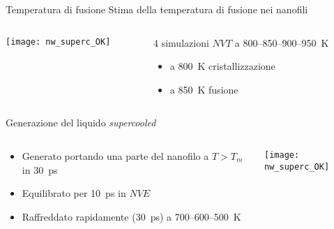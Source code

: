 \documentclass{beamer}
\begin{document}
\begin{frame}{Temperatura di fusione}
\centering
Stima della temperatura di fusione nei nanofili\\[12pt]
\begin{columns}
\begin{column}{0.4\textwidth}
\texttt{[image: nw\_superc\_OK]}
\end{column}
%
\begin{column}{0.6\textwidth}
 4 simulazioni $NVT$ a \num{800}--\num{850}--\num{900}--\SI{950}{K}%
  \begin{itemize}
    \item a \SI{800}{K} {\ev cristallizzazione}
    \item a \SI{850}{K} {\ev fusione}
  \end{itemize}
\end{column}
\end{columns}

\end{frame}




\begin{frame}{Generazione del liquido \emph{supercooled}}
 \begin{columns}
  \begin{column}{0.5\textwidth}
   \begin{itemize}
    \item Generato portando una parte del nanofilo a $T > T_m$ in \SI{30}{ps}
    \item Equilibrato per \SI{10}{ps} in $NVE$
    \item Raffreddato rapidamente (\SI{30}{ps}) a \num{700}--\num{600}--\SI{500}{K}
   \end{itemize}

  \end{column}
  \begin{column}{0.5\textwidth}
   \texttt{[image: nw\_superc\_OK]}
  \end{column}
 \end{columns}
\end{frame}
\end{document}
